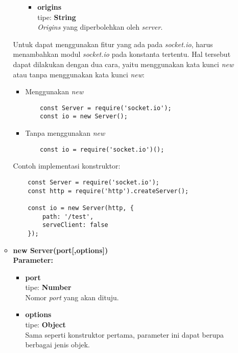 \begin{enumerate}
\begin{itemize}
\begin{itemize}
\begin{itemize}
				\item \textbf{origins} \\ tipe: \textbf{String} \\ \textit{Origins} yang diperbolehkan oleh \textit{server}.
				
			\end{itemize}
		\end{itemize}
	
		Untuk dapat menggunakan fitur yang ada pada \textit{socket.io}, harus menambahkan modul \textit{socket.io} pada konstanta tertentu. Hal tersebut dapat dilakukan dengan dua cara, yaitu menggunakan kata kunci \textit{new} atau tanpa menggunakan kata kunci \textit{new}:
		
		\begin{itemize}
			\item Menggunakan \textit{new}
	\begin{lstlisting}
	const Server = require('socket.io');
	const io = new Server();
	\end{lstlisting}
			
			\item Tanpa menggunakan \textit{new}
	\begin{lstlisting}
	const io = require('socket.io')();
	\end{lstlisting}
		\end{itemize}
	
	Contoh implementasi konstruktor:
	
	\begin{lstlisting}
	const Server = require('socket.io');
	const http = require('http').createServer();
		
	const io = new Server(http, {
		path: '/test',
		serveClient: false
	});
	\end{lstlisting}
	
	\item \textbf{new Server(port[,options])} \\
	\textbf{Parameter:}
	\begin{itemize}
		\item \textbf{port} \\ tipe: \textbf{Number} \\ Nomor \textit{port} yang akan dituju.
		\item \textbf{options} \\ tipe: \textbf{Object} \\ Sama seperti konstruktor pertama, parameter ini dapat berupa berbagai jenis objek.
	\end{itemize}
	

\end{itemize}
\end{enumerate}
